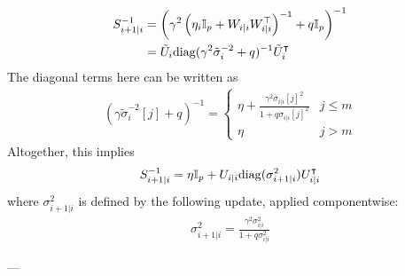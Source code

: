 \begin{align}
S_{i+1|i}^{-1} &= \left(\gamma^{2}\left(\eta_{i}\mathbb{I}_{p}+W_{i\vert i}W_{i\vert i}^{\top}\right)^{-1}+q\mathbb{I}_{p}\right)^{-1} \\
&= \tilde{U}_i\mathrm{diag}(\gamma^2\tilde{\sigma}_i^{-2}+q)^{-1}\tilde{U}_i^\intercal
\end{align}
The diagonal terms here can be written as
\begin{align}
    (\gamma\tilde{\sigma}_i^{-2}[j]+q)^{-1} = \begin{cases}
        \eta + \frac{\gamma^{2}\sigma_{i\vert i}[j]^{2}}{1+q\sigma_{i\vert i}[j]^{2}} & j\le m \\
        \eta & j>m
    \end{cases}
\end{align}
Altogether, this implies 
\begin{align}
S_{i+1|i}^{-1} = \eta\mathbb{I}_p + U_{i|i}\mathrm{diag}(\sigma^2_{i+1|i})U_{i|i}^\intercal
\end{align}
where $\sigma^2_{i+1|i}$ is defined by the following update, applied componentwise:
\begin{align}
\sigma_{i+1\vert i}^{2}=\frac{\gamma^{2}\sigma_{i\vert i}^{2}}{1+q\sigma_{i\vert i}^{2}}
\end{align}

---

